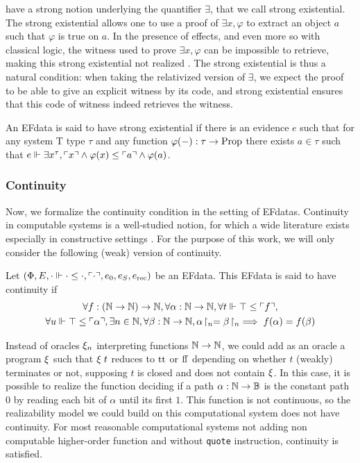 \documentclass[a4paper,UKenglish,cleveref, autoref, thm-restate]{lipics-v2021}
\begin{document}
have a strong notion underlying the quantifier $\exists$, that we call strong existential. The strong existential allows one to use a proof of $\exists x, \varphi$ to extract an object $a$ such that $\varphi$ is true on $a$. In the presence of effects, and even more so with classical logic,
the witness used to prove $\exists x, \varphi$ can be impossible to retrieve, making
this strong existential not realized \cite{Herbelin05}.
The strong existential is thus a natural condition: when taking the relativized version of $\exists$, we expect the proof to be able to give an explicit witness by its code, and strong existential ensures that this code of witness indeed retrieves the witness.
\begin{definition}
  An EFdata is said to have strong existential if there is an evidence $e$ such that for any system T type $\tau$ and any function $\varphi(-) : \tau \to \mathrm{Prop}$ there exists $a \in \tau$ such that
  $e \Vdash \exists x^\tau, \ulcorner x\urcorner \land \varphi(x) \leq \ulcorner a\urcorner \land \varphi(a)$.
\end{definition}


\subsubsection{Continuity}
Now, we formalize the continuity condition in the setting of EFdatas.
Continuity in computable systems is a well-studied notion, for which a wide literature exists especially
in constructive settings \cite{TroelstraVanDalen,Ishihara92,vanOosten11PCAFun,Escardo13,BaiEtAl25}.
For the purpose of this work, we will only consider the following (weak) version of continuity.

\begin{definition}[Continuity]
  Let $(\Phi,E,\cdot \Vdash \cdot \leq \cdot, \ulcorner\cdot\urcorner, e_0,e_S,e_{\mathrm{rec}})$ be an EFdata. This EFdata is said to have continuity if
  \begin{multline*}
    \forall f : (\mathbb N \to \mathbb N) \to \mathbb N, \forall \alpha : \mathbb N \to \mathbb N, \forall t \Vdash \top \leq \ulcorner f\urcorner,
    \\\forall u \Vdash \top \leq \ulcorner\alpha\urcorner, \exists n \in \mathbb N,
    \forall \beta:\mathbb N\to\mathbb N,{\alpha}\!\upharpoonright_{n} = {\beta}\!\upharpoonright_{n} \implies f(\alpha) = f(\beta)
  \end{multline*}
\end{definition}
\begin{example}
Instead of oracles $\xi_n$ interpreting functions $\mathbb N \to \mathbb N$, we could add as an oracle a program $\xi$ such that $\xi\;t$ reduces to $\mathrm{tt}$ or $\mathrm{ff}$ depending on whether $t$ (weakly) terminates or not, supposing $t$ is closed and does not contain $\xi$. In this case, it is possible to realize the function deciding if a path $\alpha : \mathbb N \to \mathbb B$ is the constant path $0$ by reading each bit of $\alpha$ until its first $1$. This function is not continuous, so the realizability model we could build on this computational system does not have continuity. For most reasonable computational systems not adding non computable higher-order function and without \texttt{quote} instruction, continuity is satisfied.
\end{example}
\end{document}
